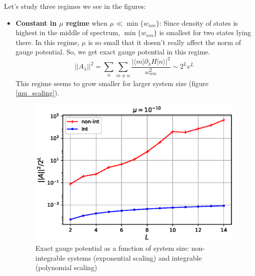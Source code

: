 \documentclass[11pt,a4paper]{article}
\begin{document}
 Let's study three regimes we see in the figures: 
\begin{itemize}
\item \textbf{Constant in $\mu$ regime} when $\mu \ll \min\{w_{nm}\}$: Since density of states is highest in the middle of spectrum, $\min\{w_{nm}\}$ is smallest for two states lying there. In this regime, $\mu$ is so small that it doesn't really affect the norm of gauge potential. So, we get exact gauge potential in this regime.
\begin{equation}
||A_{\lambda}||^2 = \sum_n \sum_{m \neq n}  \dfrac{|\langle m | \partial_{\lambda}H| n \rangle|^2}{\omega_{nm}^2}  \sim 2^Le^L
\end{equation}
This regime seems to grow smaller for larger system size (figure \ref{mu_scaling}).


\begin{figure}[!ht]
\begin{center}
\includegraphics[scale=0.7]{new_pics/v2_1_norm_L_scaling.eps}
\caption{Exact gauge potential as a function of system size: non-integrable systems (exponential scaling) and integrable (polynomial scaling) }
\end{center}
\end{figure}



\end{itemize}
\end{document}
